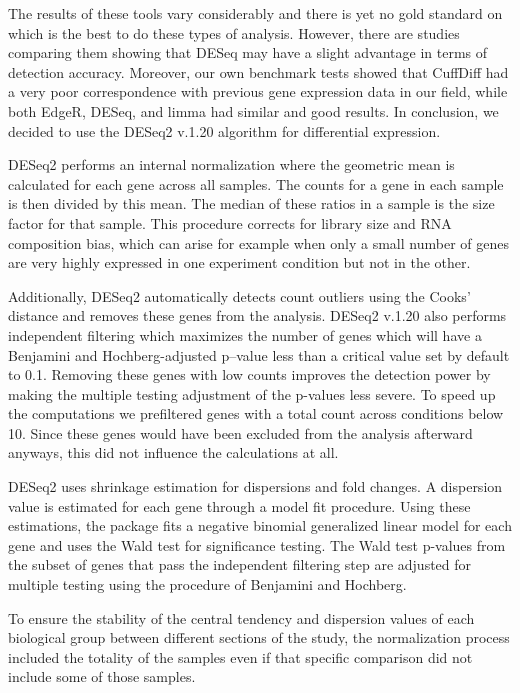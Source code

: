 The results of these tools vary considerably and there is yet no gold standard on which is the best to do these types of analysis. However, there are studies comparing them showing that DESeq may have a slight advantage in terms of detection accuracy.\cite{Seyednasrollah2015} Moreover, our own benchmark tests showed that CuffDiff had a very poor correspondence with previous gene expression data in our field, while both EdgeR, DESeq, and limma had similar and good results. In conclusion, we decided to use the DESeq2 v.1.20 algorithm for differential expression.\cite{Love2014}

DESeq2 performs an internal normalization where the geometric mean is calculated for each gene across all samples. The counts for a gene in each sample is then divided by this mean. The median of these ratios in a sample is the size factor for that sample. This procedure corrects for library size and RNA composition bias, which can arise for example when only a small number of genes are very highly expressed in one experiment condition but not in the other.

Additionally, DESeq2 automatically detects count outliers using the Cooks' distance and removes these genes from the analysis. DESeq2 v.1.20 also performs independent filtering which maximizes the number of genes which will have a Benjamini and Hochberg-adjusted p–value\cite{Benjamini1995} less than a critical value set by default to 0.1. Removing these genes with low counts improves the detection power by making the multiple testing adjustment of the p-values less severe. To speed up the computations we prefiltered genes with a total count across conditions below 10. Since these genes would have been excluded from the analysis afterward anyways, this did not influence the calculations at all.

DESeq2 uses shrinkage estimation for dispersions and fold changes. A dispersion value is estimated for each gene through a model fit procedure. Using these estimations, the package fits a negative binomial generalized linear model for each gene and uses the Wald test for significance testing. The Wald test p-values from the subset of genes that pass the independent filtering step are adjusted for multiple testing using the procedure of Benjamini and Hochberg.\cite{Benjamini1995}

To ensure the stability of the central tendency and dispersion values of each biological group between different sections of the study, the normalization process included the totality of the samples even if that specific comparison did not include some of those samples.

